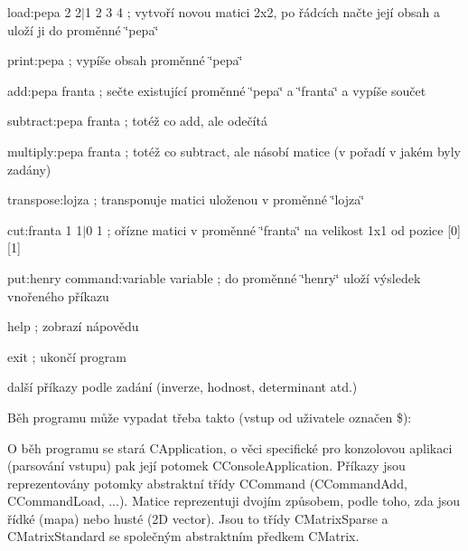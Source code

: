 \begin{DoxyItemize}
\item {\ttfamily load\+:pepa 2 2$\vert$1 2 3 4 ;} vytvoří novou matici 2x2, po řádcích načte její obsah a uloží ji do proměnné \char`\"{}pepa\char`\"{}
\item {\ttfamily print\+:pepa ;} vypíše obsah proměnné \char`\"{}pepa\char`\"{}
\item {\ttfamily add\+:pepa franta ;} sečte existující proměnné \char`\"{}pepa\char`\"{} a \char`\"{}franta\char`\"{} a vypíše součet
\item {\ttfamily subtract\+:pepa franta ;} totéž co add, ale odečítá
\item {\ttfamily multiply\+:pepa franta ;} totéž co subtract, ale násobí matice (v pořadí v jakém byly zadány)
\item {\ttfamily transpose\+:lojza ;} transponuje matici uloženou v proměnné \char`\"{}lojza\char`\"{}
\item {\ttfamily cut\+:franta 1 1$\vert$0 1 ;} ořízne matici v proměnné \char`\"{}franta\char`\"{} na velikost 1x1 od pozice \mbox{[}0\mbox{]}\mbox{[}1\mbox{]}
\item {\ttfamily put\+:henry command\+:variable variable ;} do proměnné \char`\"{}henry\char`\"{} uloží výsledek vnořeného příkazu
\item {\ttfamily help ;} zobrazí nápovědu
\item {\ttfamily exit ;} ukončí program
\item další příkazy podle zadání (inverze, hodnost, determinant atd.)
\end{DoxyItemize}

Běh programu může vypadat třeba takto (vstup od uživatele označen \$)\+:




O běh programu se stará {\ttfamily C\+Application}, o věci specifické pro konzolovou aplikaci (parsování vstupu) pak její potomek {\ttfamily C\+Console\+Application}. Příkazy jsou reprezentovány potomky abstraktní třídy {\ttfamily C\+Command} ({\ttfamily C\+Command\+Add}, {\ttfamily C\+Command\+Load}, ...). Matice reprezentuji dvojím způsobem, podle toho, zda jsou řídké (mapa) nebo husté (2D vector). Jsou to třídy {\ttfamily C\+Matrix\+Sparse} a {\ttfamily C\+Matrix\+Standard} se společným abstraktním předkem {\ttfamily C\+Matrix}.

